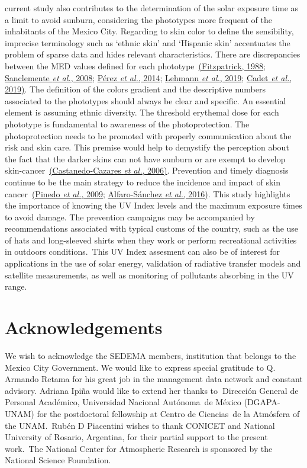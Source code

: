 \documentclass[10pt]{article}
\begin{document}
current study also contributes to the determination of the solar
exposure time as a limit to avoid sunburn, considering the phototypes
more frequent of the inhabitants of the Mexico City. Regarding to skin
color to define the sensibility, imprecise terminology such as `ethnic
skin' and `Hispanic skin' accentuates the problem of sparse data and
hides relevant characteristics. There are discrepancies between the MED
values defined for each phototype~\hyperref[csl:30]{(Fitzpatrick, 1988}; \hyperref[csl:72]{Sanclemente \textit{et al.}, 2008}; \hyperref[csl:31]{Pérez \textit{et al.}, 2014}; \hyperref[csl:33]{Lehmann \textit{et al.}, 2019}; \hyperref[csl:64]{Cadet \textit{et al.}, 2019)}. The definition of
the colors gradient and the descriptive numbers associated to the
phototypes should always be clear and specific. An essential element is
assuming ethnic diversity. The threshold erythemal dose for each
phototype is fundamental to awareness of the photoprotection. The
photoprotection needs to be promoted with properly communication about
the risk and skin care. This premise would help to demystify the
perception about the fact that the darker skins can not have sunburn or
are exempt to develop skin-cancer~\hyperref[csl:41]{(Castanedo-Cazares \textit{et al.}, 2006)}. Prevention and
timely diagnosis continue to be the main strategy to reduce the
incidence and impact of skin cancer~\hyperref[csl:73]{(Pinedo \textit{et al.}, 2009}; \hyperref[csl:74]{Alfaro-Sánchez \textit{et al.}, 2016)}. This study
highlights the importance of knowing the UV Index levels and the maximum
exposure times to avoid damage. The prevention campaigns may be
accompanied by recommendations associated with typical customs of the
country, such as the use of hats and long-sleeved shirts when they work
or perform recreational activities in outdoors conditions.~This UV Index
assesment can also be of interest for applications in the use of solar
energy, validation of radiative transfer models and satellite
measurements, as well as monitoring of pollutants absorbing in the UV
range.

\section*{Acknowledgements}

{\label{667124}}

We wish to acknowledge the SEDEMA members, institution that belongs to
the Mexico City Government. We would like to express special gratitude
to Q. Armando Retama for his great job in the management data network
and constant advisory. Adriana Ipiña would like to extend her thanks
to\textbf{~}Dirección General de Personal Académico, Universidad
Nacional Autónoma~de México (DGAPA-UNAM) for the postdoctoral fellowship
at Centro de Ciencias~de la Atmósfera of the UNAM.~Rubén D Piacentini
wishes to thank CONICET and National University of Rosario, Argentina,
for their partial support to the present work.~The National Center for
Atmospheric Research is sponsored by the National Science Foundation.
\end{document}
